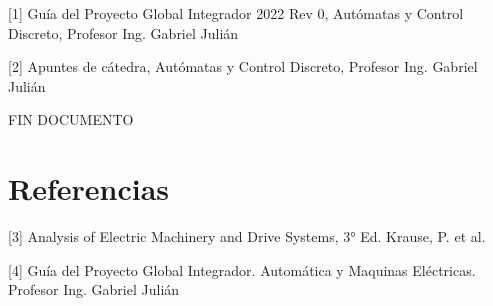 \documentclass[11pt]{article}
\begin{document}
[1] Guía del Proyecto Global Integrador 2022 Rev 0, Autómatas y Control Discreto, Profesor Ing. Gabriel Julián

[2] Apuntes de cátedra, Autómatas y Control Discreto, Profesor Ing. Gabriel Julián









\newpage
FIN DOCUMENTO
\newpage






\section{Referencias}

[3] Analysis of Electric Machinery and Drive Systems, 3° Ed. Krause, P. et al.

[4] Guía del Proyecto Global Integrador. Automática y Maquinas Eléctricas. Profesor Ing. Gabriel Julián
\end{document}
